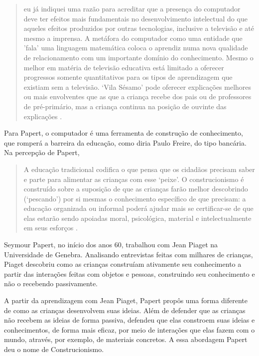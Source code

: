 \documentclass{textolivre}
\begin{document}
\begin{quote}
eu já indiquei uma razão para acreditar que a presença do computador deve ter efeitos mais fundamentais no desenvolvimento intelectual do que aqueles efeitos produzidos por outras tecnologias, inclusive a televisão e até mesmo a imprensa. A metáfora do computador como uma entidade que ’fala’ uma linguagem matemática coloca o aprendiz numa nova qualidade de relacionamento com um importante domínio do conhecimento. Mesmo o melhor em matéria de televisão educativa está limitado a oferecer progressos somente quantitativos para os tipos de aprendizagem que existiam sem a televisão. ‘Vila Sésamo’ pode oferecer explicações melhores ou mais envolventes que as que a criança recebe dos pais ou de professores de pré-primário, mas a criança continua na posição de ouvinte das explicações \cite[p. 36]{papert1980}.
\end{quote}

Para Papert, o computador é uma ferramenta de construção de conhecimento, que romperá a barreira da educação, como diria Paulo Freire, do tipo bancária. Na percepção de Papert, 

\begin{quote}
A educação tradicional codifica o que pensa que os cidadãos precisam saber e parte para alimentar as crianças com esse ‘peixe’. O construcionismo é construído sobre a suposição de que as crianças farão melhor descobrindo (‘pescando’) por si mesmas o conhecimento específico de que precisam: a educação organizada ou informal poderá ajudar mais se certificar-se de que elas estarão sendo apoiadas moral, psicológica, material e intelectualmente em seus esforços \cite[p. 135]{papert1980}.
\end{quote}

Seymour Papert, no início dos anos 60, trabalhou com Jean Piaget na Universidade de Genebra. Analisando entrevistas feitas com milhares de crianças, Piaget descobriu como as crianças construíam ativamente seu conhecimento a partir das interações feitas com objetos e pessoas, construindo seu conhecimento e não o recebendo passivamente.

A partir da aprendizagem com Jean Piaget, Papert propôs uma forma diferente de como as crianças desenvolvem suas ideias. Além de defender que as crianças não recebem as ideias de forma passiva, defendeu que elas constroem suas ideias e conhecimentos, de forma mais eficaz, por meio de interações que elas fazem com o mundo, através, por exemplo, de materiais concretos. A essa abordagem Papert deu o nome de Construcionismo.
\end{document}

